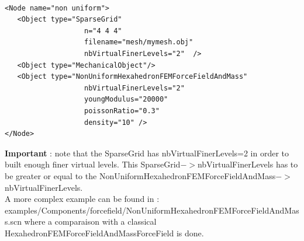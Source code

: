 \begin{verbatim}

<Node name="non uniform">
   <Object type="SparseGrid"
                   n="4 4 4"
                   filename="mesh/mymesh.obj"
                   nbVirtualFinerLevels="2"  />
   <Object type="MechanicalObject"/>
   <Object type="NonUniformHexahedronFEMForceFieldAndMass"
                   nbVirtualFinerLevels="2"
                   youngModulus="20000"
                   poissonRatio="0.3"
                   density="10" />
</Node>

\end{verbatim}

\textbf{Important} : note that the SparseGrid has nbVirtualFinerLevels=2 in order to built enough finer virtual levels. This SparseGrid$->$nbVirtualFinerLevels has to be greater or equal to the NonUniformHexahedronFEMForceFieldAndMass$->$nbVirtualFinerLevels.
\\

A more complex example can be found in : examples/Components/forcefield/NonUniformHexahedronFEMForceFieldAndMass.scn where a comparaison with a classical HexahedronFEMForceFieldAndMassForceField is done.


